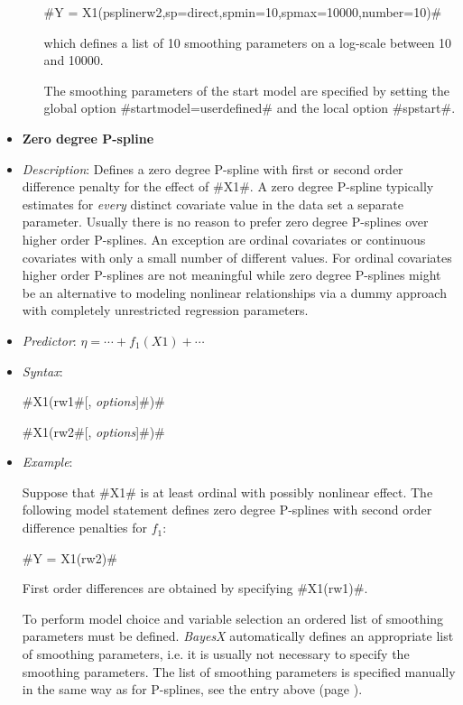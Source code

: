\begin{itemize}
\begin{itemize}
#Y = X1(psplinerw2,sp=direct,spmin=10,spmax=10000,number=10)#

which defines a list of 10 smoothing parameters on a log-scale between 10 and 10000.

The smoothing parameters of the start model are specified by setting the global option #startmodel=userdefined# and the local option #spstart#.





\end{itemize}
\item[]{\bf\sffamily Zero degree P-spline }

\item[] {\em Description}: Defines a zero degree P-spline with first or second order difference penalty for the effect of #X1#.
A zero degree P-spline typically estimates for {\em every} distinct covariate value in the data set a separate parameter. Usually there
is no reason to prefer zero degree P-splines over higher order P-splines. An exception are ordinal covariates or continuous
covariates with only a small number of
different values. For ordinal covariates higher order P-splines are not meaningful while zero degree P-splines might be an alternative to
modeling nonlinear relationships via a dummy approach with completely unrestricted regression parameters.
\item[] {\em Predictor}: $\eta = \cdots + f_1(X1) + \cdots $
\item[] {\em Syntax}:

#X1(rw1#[, {\em options}]#)#

#X1(rw2#[, {\em options}]#)#
\item[] {\em Example}:

Suppose that #X1# is at least ordinal with possibly
nonlinear effect. The following model statement defines zero degree P-splines with second order difference penalties for $f_1$:

#Y = X1(rw2)#

First order differences are obtained by
specifying #X1(rw1)#.

To perform model choice and variable selection an ordered list of smoothing parameters must be defined. {\em BayesX} automatically defines an appropriate list of smoothing
parameters, i.e. it is usually not necessary to  specify the smoothing parameters. The list of smoothing parameters is
specified manually in the same way as for P-splines, see the entry above (page \pageref{psplines_stepwise}).


\end{itemize}
